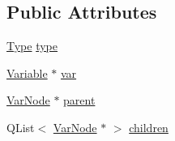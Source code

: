 \subsection*{Public Attributes}
\begin{DoxyCompactItemize}
\item 
\hyperlink{class_var_node_a48af8dc13f1e224b21c7ad1d4763c075}{Type} \hyperlink{class_var_node_ac8a7356019869b99be0dad760909e510}{type}
\item 
\hyperlink{class_variable}{Variable} $\ast$ \hyperlink{class_var_node_a3fbf3232482e35a5d1e2bfb2ac58bc47}{var}
\item 
\hyperlink{class_var_node}{VarNode} $\ast$ \hyperlink{class_var_node_a161c85b938b0ca27ee263ec70394dcca}{parent}
\item 
QList$<$ \hyperlink{class_var_node}{VarNode} $\ast$ $>$ \hyperlink{class_var_node_a8768caf8ce89a4a85ccb6600d8938be9}{children}
\end{DoxyCompactItemize}



